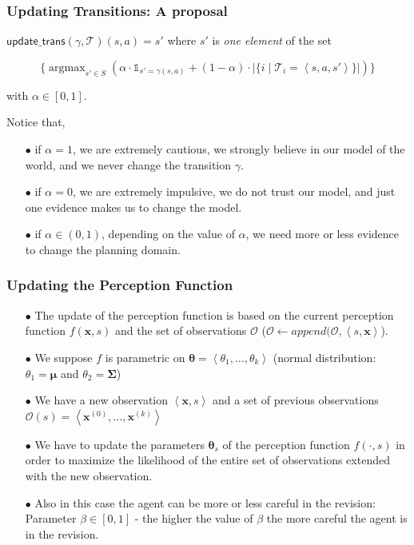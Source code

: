 \documentclass{beamer}
\DeclareMathOperator*{\argmax}{argmax}
\def\updgamma{\mathsf{update\_trans}}
\def\bmu{\pmb{\mu}}
\def\bSigma{\pmb{\Sigma}}
\def\bx{\pmb{x}}
\def\T{\mathcal{T}}
\def\O{\mathcal{O}}
\def\prm{\pmb{\theta}}
\begin{document}
\begin{frame} 
  \frametitle{Updating Transitions: A proposal} 

$\updgamma(\gamma,\T)(s,a)=s'$  where $s'$ is \emph{one element}
of the set

$$
\{\argmax_{s'\in S}\left(\alpha\cdot\mathbb{1}_{s'=\gamma(s,a)}+
    (1-\alpha)\cdot|\{i\mid \T_i=\left<s,a,s'\right>\}|
\right)\}
$$

with $\alpha\in[0,1]$.

\pause
\vspace{1cm}
Notice that,
\begin{itemize}
\item[$\bullet$] 
if {\color {red} $\alpha = 1$}, we are extremely cautious, we strongly believe in our
model of the world, and we never change the transition $\gamma$.
\pause
\item[$\bullet$] 
if {\color {red} $\alpha = 0$}, we are extremely impulsive, we do not trust our model,
and just one evidence makes us to change the model.
\pause
\item[$\bullet$] 
if {\color {red} $\alpha \in (0,1)$}, depending on the value of
$\alpha$, we need more or less evidence to change the planning
domain.
\end{itemize}

\end{frame}

\begin{frame} 
  \frametitle{Updating the Perception Function} 

\begin{itemize}
\item[$\bullet$]
The update of the perception function is based on the 
{\color {red} current
perception function $f(\bx,s)$} and 
{\color {red} the set of observations $\O$} ($\O \gets append(\O,\left<s,\bx\right>$). 
\pause
\item[$\bullet$]
We suppose 
{\color {red} $f$ is parametric on $\prm=\left<\theta_1,\dots,\theta_k\right>$}
(normal distribution: 
{\color {red} 
$\theta_1=\bmu$ and $\theta_2=\bSigma$}) 
\pause
\item[$\bullet$]
We have a new observation $\left<\bx,s\right>$ and a set of previous
observations $\O(s)=\left<\bx^{(0)},\dots, \bx^{(k)}\right>$ \pause
\item[$\bullet$]
We have to 
{\color {red} 
update the parameters $\prm_s$} of
the perception function $f(\cdot,s)$ in order to
{\color {red}  maximize the likelihood} of the entire set of observations extended
with the new observation.
\pause
\item[$\bullet$]
Also in this case the agent can be more or less
careful in the revision: Parameter 
{\color {red}  $\beta\in[0,1]$} -  the higher the value of $\beta$ the more careful the agent is in the revision.
\end{itemize}

\end{frame}
\end{document}
